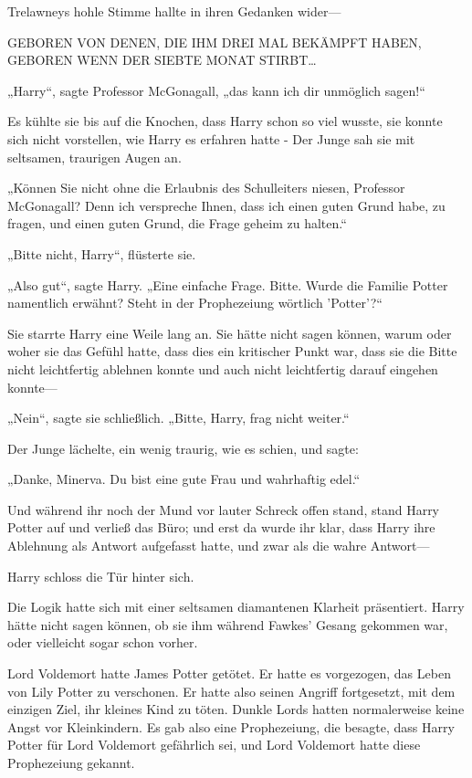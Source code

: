 {Trelawneys hohle Stimme hallte in ihren Gedanken wider—

GEBOREN VON DENEN, DIE IHM DREI MAL BEKÄMPFT HABEN, GEBOREN WENN DER SIEBTE MONAT STIRBT…

„Harry“, sagte Professor McGonagall, „das kann ich dir unmöglich sagen!“

Es kühlte sie bis auf die Knochen, dass Harry schon so viel wusste, sie konnte sich nicht vorstellen, wie Harry es erfahren hatte - Der Junge sah sie mit seltsamen, traurigen Augen an.

„Können Sie nicht ohne die Erlaubnis des Schulleiters niesen, Professor McGonagall? Denn ich verspreche Ihnen, dass ich einen guten Grund habe, zu fragen, und einen guten Grund, die Frage geheim zu halten.“

„Bitte nicht, Harry“, flüsterte sie.

„Also gut“, sagte Harry. „Eine einfache Frage. Bitte. Wurde die Familie Potter namentlich erwähnt? Steht in der Prophezeiung wörtlich 'Potter'?“

Sie starrte Harry eine Weile lang an. Sie hätte nicht sagen können, warum oder woher sie das Gefühl hatte, dass dies ein kritischer Punkt war, dass sie die Bitte nicht leichtfertig ablehnen konnte und auch nicht leichtfertig darauf eingehen konnte—

„Nein“, sagte sie schließlich. „Bitte, Harry, frag nicht weiter.“

Der Junge lächelte, ein wenig traurig, wie es schien, und sagte:

„Danke, Minerva. Du bist eine gute Frau und wahrhaftig edel.“

Und während ihr noch der Mund vor lauter Schreck offen stand, stand Harry Potter auf und verließ das Büro; und erst da wurde ihr klar, dass Harry ihre Ablehnung als Antwort aufgefasst hatte, und zwar als die wahre Antwort—

Harry schloss die Tür hinter sich.

Die Logik hatte sich mit einer seltsamen diamantenen Klarheit präsentiert. Harry hätte nicht sagen können, ob sie ihm während Fawkes' Gesang gekommen war, oder vielleicht sogar schon vorher.

Lord Voldemort hatte James Potter getötet. Er hatte es vorgezogen, das Leben von Lily Potter zu verschonen. Er hatte also seinen Angriff fortgesetzt, mit dem einzigen Ziel, ihr kleines Kind zu töten. Dunkle Lords hatten normalerweise keine Angst vor Kleinkindern. Es gab also eine Prophezeiung, die besagte, dass Harry Potter für Lord Voldemort gefährlich sei, und Lord Voldemort hatte diese Prophezeiung gekannt.

}
